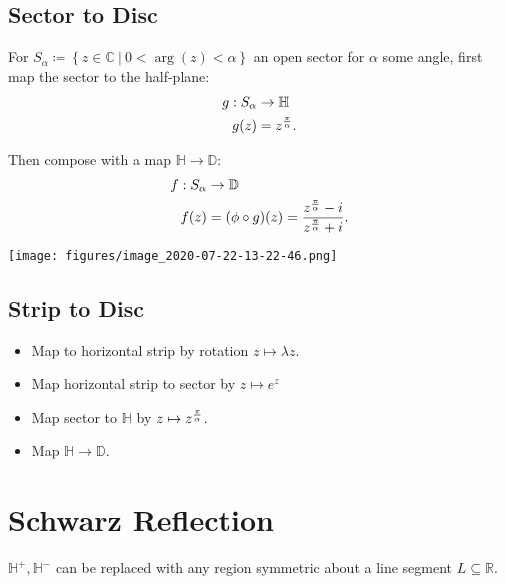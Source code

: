\hypertarget{sector-to-disc}{%
\subsection{Sector to Disc}\label{sector-to-disc}}

For
\(S_\alpha \coloneqq\left\{{z\in{\mathbb{C}}{~\mathrel{\Big|}~}0 < \arg(z) < \alpha }\right\}\)
an open sector for \(\alpha\) some angle, first map the sector to the
half-plane:
\begin{align*}
g: S_\alpha &\to {\mathbb{H}}\\
g(z) &= z^{\pi \over \alpha}
.\end{align*}

Then compose with a map \({\mathbb{H}}\to{\mathbb{D}}\):
\begin{align*}
f: S_\alpha &\to {\mathbb{D}}\\
f(z) &= (\phi \circ g)(z) = {z^{\pi\over \alpha} - i \over z^{\pi\over\alpha} + i}
.\end{align*}

\texttt{[image: figures/image\_2020-07-22-13-22-46.png]}

\hypertarget{strip-to-disc}{%
\subsection{Strip to Disc}\label{strip-to-disc}}

\begin{itemize}
\tightlist
\item
  Map to horizontal strip by rotation \(z\mapsto \lambda z\).
\item
  Map horizontal strip to sector by \(z \mapsto e^z\)
\item
  Map sector to \({\mathbb{H}}\) by \(z\mapsto z^{\pi\over\alpha}\).
\item
  Map \({\mathbb{H}}\to{\mathbb{D}}\).
\end{itemize}

\hypertarget{schwarz-reflection}{%
\section{Schwarz Reflection}\label{schwarz-reflection}}

\begin{remark}

\({\mathbb{H}}^+, {\mathbb{H}}^-\) can be replaced with any region
symmetric about a line segment \(L\subseteq {\mathbb{R}}\).

\end{remark}

